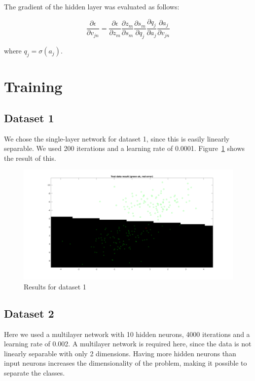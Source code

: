 \documentclass{article}
\begin{document}
The gradient of the hidden layer was evaluated as follows:

\begin{equation}
  \frac{\partial \epsilon}{\partial v_{jn}} =
  \frac{\partial \epsilon}{\partial z_m}
  \frac{\partial z_m}{\partial s_m}
  \frac{\partial s_m}{\partial q_j}
  \frac{\partial q_j}{\partial a_j}
  \frac{\partial a_j}{\partial v_{jn}}
\end{equation}

where $q_j = \sigma(a_j)$.

\section{Training}

\subsection{Dataset 1}

We chose the single-layer network for dataset 1, since this is easily
linearly separable. We used 200 iterations and a learning rate of
0.0001. Figure~\ref{fig:res1} shows the result of this.

\begin{figure}
    \includegraphics[width=13cm]{dataset1res.png}
    \caption{Results for dataset 1}
    \label{fig:res1}
\end{figure}

\subsection{Dataset 2}

Here we used a multilayer network with 10 hidden neurons, 4000
iterations and a learning rate of 0.002. A multilayer network is
required here, since the data is not linearly separable with only 2
dimensions. Having more hidden neurons than input neurons increases
the dimensionality of the problem, making it possible to separate the
classes.
\end{document}
